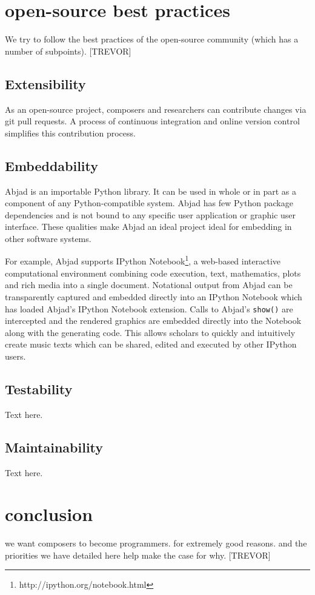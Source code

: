 \documentclass{article}
\begin{document}
\section{open-source best practices}

We try to follow the best practices of the open-source community (which has a
number of subpoints). [TREVOR]

\subsection{Extensibility}

As an open-source project, composers and researchers can contribute changes via
git pull requests. A process of continuous integration and online version
control simplifies this contribution process. 

\subsection{Embeddability}

Abjad is an importable Python library. It can be used in whole or in part as a
component of any Python-compatible system. Abjad has few Python package
dependencies and is not bound to any specific user application or graphic user
interface. These qualities make Abjad an ideal project ideal for embedding in
other software systems.

For example, Abjad supports IPython
Notebook\footnote{http://ipython.org/notebook.html}, a web-based interactive
computational environment combining code execution, text, mathematics, plots
and rich media into a single document. Notational output from Abjad can be
transparently captured and embedded directly into an IPython Notebook which has
loaded Abjad's IPython Notebook extension. Calls to Abjad's \texttt{show()} are
intercepted and the rendered graphics are embedded directly into the Notebook
along with the generating code. This allows scholars to quickly and intuitively
create music texts which can be shared, edited and executed by other IPython
users.

\subsection{Testability}

Text here.

\subsection{Maintainability}

Text here.

\section{conclusion}

we want composers to become programmers. for extremely good reasons. and the
priorities we have detailed here help make the case for why. [TREVOR]


\end{document}
